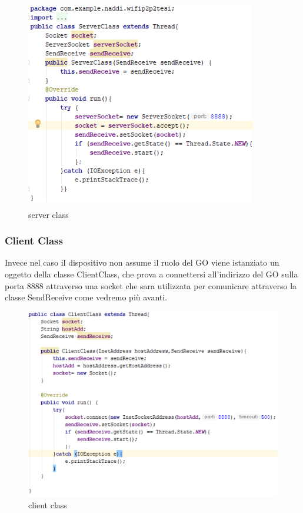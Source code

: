 \begin{figure}
    \caption{server class}
    \includegraphics[width=0.8\columnwidth]{imgs/serverClass.png}
    \centering
\end{figure}


\subsubsection{Client Class}
Invece nel caso il dispositivo non assume il ruolo del GO
viene istanziato un oggetto della classe ClientClass,
che prova a connettersi all'indirizzo del GO sulla porta 8888 attraverso
una socket che sara utilizzata per comunicare
attraverso la classe SendReceive come vedremo più avanti.
    
\begin{figure}
    \caption{client class}
    \includegraphics[width=1\columnwidth]{imgs/clientClass.png}
    \centering
\end{figure}



